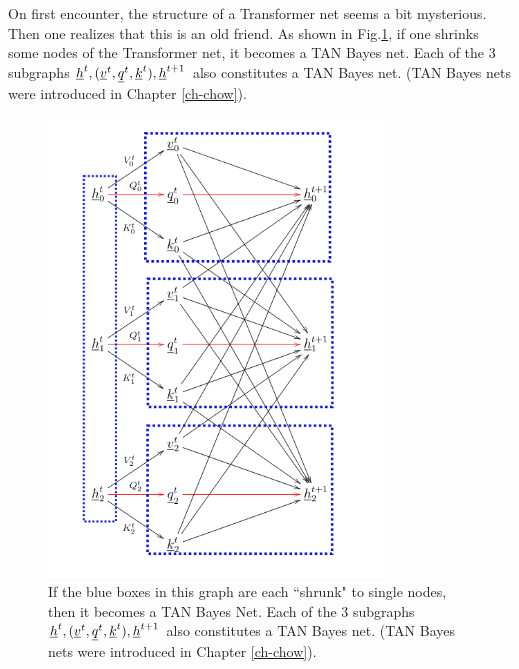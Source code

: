 On first encounter, the structure of a Transformer net
seems a bit mysterious. Then one realizes that this is
an old friend. As shown in Fig.\ref{fig-transformer-TAN-Bayes}, if one 
shrinks some nodes
of the Transformer net, it becomes a TAN Bayes net. Each of the 3 subgraphs ${\underline{h}}^t, ({\underline{v}}^t, {\underline{q}}^t, {\underline{k}}^t), {\underline{h}}^{t+1} $
also constitutes a TAN Bayes net. (TAN Bayes nets
were introduced in Chapter \ref{ch-chow}).

\begin{figure}[h!]
\centering
\includegraphics[width=3.5in]
{transformer/transformer-TAN-Bayes.png}
\caption{If the blue boxes in this graph are each ``shrunk" to single nodes,
then it becomes a TAN Bayes Net. Each of the 3 subgraphs ${\underline{h}}^t, ({\underline{v}}^t, {\underline{q}}^t, {\underline{k}}^t), {\underline{h}}^{t+1} $
also constitutes a TAN Bayes net. (TAN Bayes nets
were introduced in Chapter \ref{ch-chow}).}
\label{fig-transformer-TAN-Bayes}
\end{figure}

